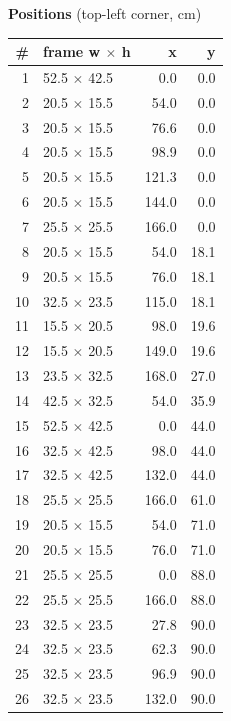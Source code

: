 \documentclass[a4paper,landscape,10pt]{article}
\begin{document}
\begin{minipage}[t]{0.25\textwidth}
\vspace{8pt}
{\bfseries Positions} (top-left corner, cm)\\[2pt]
\tiny
\begin{tabular}{@{}r l r r@{}}
\toprule
\# & frame w $\times$ h & x & y \\
\midrule
1 & 52.5 $\times$ 42.5 & 0.0 & 0.0 \\
2 & 20.5 $\times$ 15.5 & 54.0 & 0.0 \\
3 & 20.5 $\times$ 15.5 & 76.6 & 0.0 \\
4 & 20.5 $\times$ 15.5 & 98.9 & 0.0 \\
5 & 20.5 $\times$ 15.5 & 121.3 & 0.0 \\
6 & 20.5 $\times$ 15.5 & 144.0 & 0.0 \\
7 & 25.5 $\times$ 25.5 & 166.0 & 0.0 \\
8 & 20.5 $\times$ 15.5 & 54.0 & 18.1 \\
9 & 20.5 $\times$ 15.5 & 76.0 & 18.1 \\
10 & 32.5 $\times$ 23.5 & 115.0 & 18.1 \\
11 & 15.5 $\times$ 20.5 & 98.0 & 19.6 \\
12 & 15.5 $\times$ 20.5 & 149.0 & 19.6 \\
13 & 23.5 $\times$ 32.5 & 168.0 & 27.0 \\
14 & 42.5 $\times$ 32.5 & 54.0 & 35.9 \\
15 & 52.5 $\times$ 42.5 & 0.0 & 44.0 \\
16 & 32.5 $\times$ 42.5 & 98.0 & 44.0 \\
17 & 32.5 $\times$ 42.5 & 132.0 & 44.0 \\
18 & 25.5 $\times$ 25.5 & 166.0 & 61.0 \\
19 & 20.5 $\times$ 15.5 & 54.0 & 71.0 \\
20 & 20.5 $\times$ 15.5 & 76.0 & 71.0 \\
21 & 25.5 $\times$ 25.5 & 0.0 & 88.0 \\
22 & 25.5 $\times$ 25.5 & 166.0 & 88.0 \\
23 & 32.5 $\times$ 23.5 & 27.8 & 90.0 \\
24 & 32.5 $\times$ 23.5 & 62.3 & 90.0 \\
25 & 32.5 $\times$ 23.5 & 96.9 & 90.0 \\
26 & 32.5 $\times$ 23.5 & 132.0 & 90.0 \\
\bottomrule
\end{tabular}
\end{minipage}
\clearpage
\end{document}
